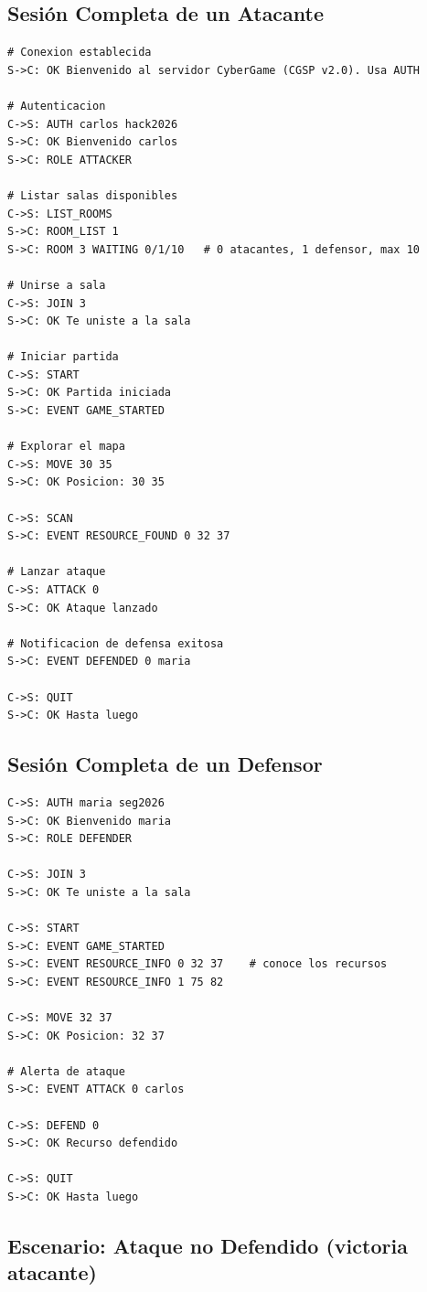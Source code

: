\documentclass[12pt, letterpaper]{article}
\begin{document}
\subsection{Sesión Completa de un Atacante}

\begin{lstlisting}
# Conexion establecida
S->C: OK Bienvenido al servidor CyberGame (CGSP v2.0). Usa AUTH

# Autenticacion
C->S: AUTH carlos hack2026
S->C: OK Bienvenido carlos
S->C: ROLE ATTACKER

# Listar salas disponibles
C->S: LIST_ROOMS
S->C: ROOM_LIST 1
S->C: ROOM 3 WAITING 0/1/10   # 0 atacantes, 1 defensor, max 10

# Unirse a sala
C->S: JOIN 3
S->C: OK Te uniste a la sala

# Iniciar partida
C->S: START
S->C: OK Partida iniciada
S->C: EVENT GAME_STARTED

# Explorar el mapa
C->S: MOVE 30 35
S->C: OK Posicion: 30 35

C->S: SCAN
S->C: EVENT RESOURCE_FOUND 0 32 37

# Lanzar ataque
C->S: ATTACK 0
S->C: OK Ataque lanzado

# Notificacion de defensa exitosa
S->C: EVENT DEFENDED 0 maria

C->S: QUIT
S->C: OK Hasta luego
\end{lstlisting}

\subsection{Sesión Completa de un Defensor}

\begin{lstlisting}
C->S: AUTH maria seg2026
S->C: OK Bienvenido maria
S->C: ROLE DEFENDER

C->S: JOIN 3
S->C: OK Te uniste a la sala

C->S: START
S->C: EVENT GAME_STARTED
S->C: EVENT RESOURCE_INFO 0 32 37    # conoce los recursos
S->C: EVENT RESOURCE_INFO 1 75 82

C->S: MOVE 32 37
S->C: OK Posicion: 32 37

# Alerta de ataque
S->C: EVENT ATTACK 0 carlos

C->S: DEFEND 0
S->C: OK Recurso defendido

C->S: QUIT
S->C: OK Hasta luego
\end{lstlisting}

\subsection{Escenario: Ataque no Defendido (victoria atacante)}
\end{document}
